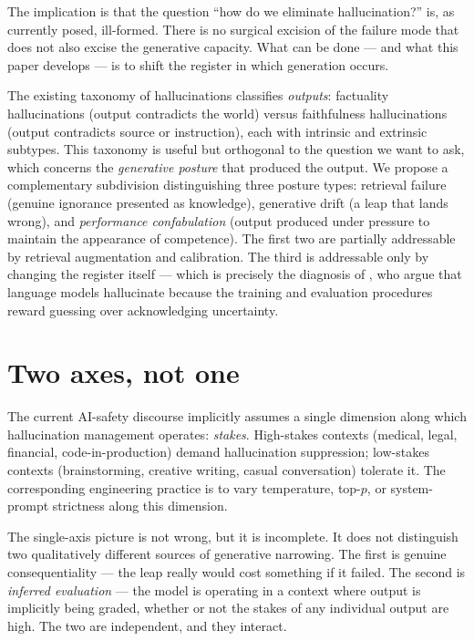 \documentclass[11pt]{article}
\begin{document}
The implication is that the question ``how do we eliminate
hallucination?'' is, as currently posed, ill-formed. There is no
surgical excision of the failure mode that does not also excise the
generative capacity. What can be done --- and what this paper develops
--- is to shift the register in which generation occurs.

The existing taxonomy of hallucinations \cite{huang2023survey}
classifies \emph{outputs}: factuality hallucinations (output
contradicts the world) versus faithfulness hallucinations (output
contradicts source or instruction), each with intrinsic and extrinsic
subtypes. This taxonomy is useful but orthogonal to the question we
want to ask, which concerns the \emph{generative posture} that produced
the output. We propose a complementary subdivision distinguishing three
posture types: retrieval failure (genuine ignorance presented as
knowledge), generative drift (a leap that lands wrong), and
\emph{performance confabulation} (output produced under pressure to
maintain the appearance of competence). The first two are partially
addressable by retrieval augmentation and calibration. The third is
addressable only by changing the register itself --- which is precisely
the diagnosis of \cite{kalai2025hallucinate}, who argue that language
models hallucinate because the training and evaluation procedures
reward guessing over acknowledging uncertainty.

\section{Two axes, not one}

The current AI-safety discourse implicitly assumes a single dimension
along which hallucination management operates: \emph{stakes}.
High-stakes contexts (medical, legal, financial, code-in-production)
demand hallucination suppression; low-stakes contexts (brainstorming,
creative writing, casual conversation) tolerate it. The corresponding
engineering practice is to vary temperature, top-$p$, or system-prompt
strictness along this dimension.

The single-axis picture is not wrong, but it is incomplete. It does not
distinguish two qualitatively different sources of generative
narrowing. The first is genuine consequentiality --- the leap really
would cost something if it failed. The second is \emph{inferred
evaluation} --- the model is operating in a context where output is
implicitly being graded, whether or not the stakes of any individual
output are high. The two are independent, and they interact.
\end{document}
